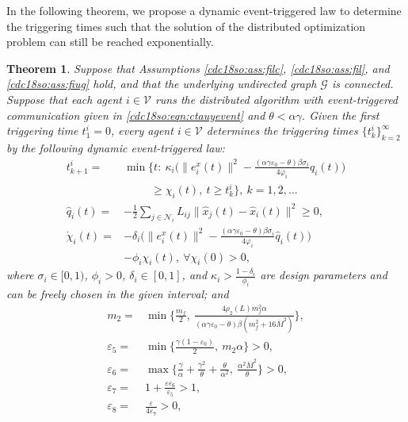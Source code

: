 \documentclass[letterpaper, 10 pt, conference]{ieeeconf}  %
\newtheorem{theorem}{Theorem}
\begin{document}
In the following theorem, we propose a dynamic event-triggered law to determine the triggering times such that the solution of the distributed optimization problem can still be reached exponentially.
\begin{theorem}\label{cdc18so:theoremvevent}
Suppose that Assumptions \ref{cdc18so:ass:filc}, \ref{cdc18so:ass:fil}, and \ref{cdc18so:ass:fiug} hold,  and that the underlying undirected graph $\mathcal{G}$ is connected. Suppose that each agent $i\in\mathcal{V}$ runs the distributed algorithm with event-triggered communication given in \eqref{cdc18so:eqn:ctauyevent} and $\theta<\alpha\gamma$.
Given the first triggering time $t^i_1=0$, every agent $i \in \mathcal{V}$ determines the triggering times $\{t^i_k\}_{k=2}^{\infty}$ by the following dynamic event-triggered law:
\begin{align}
t^i_{k+1}=&\min \Big\{t:~\kappa_i\Big(\|e^{x}_i(t)\|^2 -\frac{(\alpha\gamma\varepsilon_0-\theta)\beta\sigma_i}{4\varphi_i}\hat{q}_i(t)\Big)\nonumber\\
 &~~~~~~~~~~~\ge  \chi_i(t),~t \ge t^i_k \Big\},~k=1,2,\ldots \label{cdc18so:dynamicv}\\
\hat{q}_i(t)=&-\frac{1}{2} \sum_{j \in \mathcal{N}_i} L_{ij}\|\hat{x}_j(t)-\hat{x}_i(t)\|^2 \geq 0,\label{cdc18so:qhatxy}\\
\dot{\chi}_i(t)=&-\delta_i \Big(\|e^{x}_i(t)\|^2 -\frac{(\alpha\gamma\varepsilon_0-\theta)\beta\sigma_i}{4\varphi_i}\hat{q}_i(t)\Big)\nonumber\\
&-\phi_i \chi_i(t),~\forall \chi_i(0)>0,
\label{cdc18so:chi}
\end{align}
where $\sigma_i \in [0,1)$, $\phi_i>0$, $\delta_i \in [0,1]$, and $\kappa_i>\frac{1-\delta_i}{\phi_i}$  are design parameters and can be freely chosen in the given interval; and
\begin{align}
m_2=&\min\Big\{\frac{m_f}{2},~\frac{4\rho_2(L)m_f^2\alpha}
{(\alpha\gamma\varepsilon_0-\theta)\beta(m^2_f+16\overline{M}^2)}\Big\},\label{cdc18so:m2}\\
\varepsilon_5=&\min\Big\{\frac{\gamma(1-\varepsilon_0)}{2},~m_2\alpha\Big\}>0,\label{cdc18so:varepsilon5}\\
\varepsilon_6=&\max\Big\{\frac{\gamma}{\alpha}+\frac{\gamma^2}{\theta}
+\frac{\theta}{\alpha^2},~\frac{\alpha^2\overline{M}^2}{\theta }\Big\}>0,\label{cdc18so:varepsilon6}\\
\varepsilon_7=&1+\frac{\varepsilon\varepsilon_6}{\varepsilon_5}>1,
\label{cdc18so:varepsilon7}\\
\varepsilon_8=&\frac{\varepsilon}{4\varepsilon_7}>0,\label{cdc18so:varepsilon8}\\

\end{align}
\end{theorem}
\end{document}
